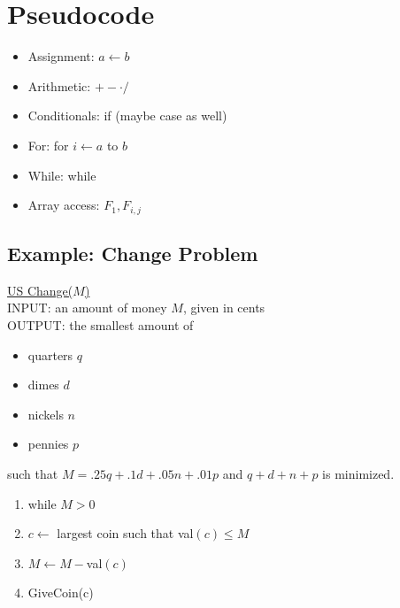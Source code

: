 \documentclass[10pt]{article}
\newenvironment{mitemize}
{
  \begin{itemize}
  \setlength{\itemsep}{1pt}
  \setlength{\parskip}{0pt}
  \setlength{\parsep}{0pt}}{\end{itemize}
}
\newenvironment{menumerate}
{
  \begin{enumerate}
  \setlength{\itemsep}{1pt}
  \setlength{\parskip}{0pt}
  \setlength{\parsep}{0pt}}{\end{enumerate}
}
\begin{document}
\section*{Pseudocode}
\begin{mitemize}
\item Assignment: $a \leftarrow b$
\item Arithmetic: $+ - \cdot /$
\item Conditionals: if (maybe case as well)
\item For: for $i \leftarrow a$ to $b$
\item While: while
\item Array access: $F_1, F_{i,j}$
\end{mitemize}

\subsection*{Example: Change Problem}
\noindent \underline{US Change($M$)} \\
\noindent INPUT: an amount of money $M$, given in cents \\
\noindent OUTPUT: the smallest amount of
\begin{mitemize}
\item quarters $q$
\item dimes $d$
\item nickels $n$
\item pennies $p$
\end{mitemize}
such that $M = .25q + .1d + .05n + .01p$ and $q+d+n+p$ is minimized.
\begin{menumerate}
\item while $M > 0$
\item \hspace{24pt} $c \leftarrow$ largest coin such that val$(c) \leq M$ 
\item \hspace{24pt} $M \leftarrow M - $val$(c)$
\item \hspace{24pt} GiveCoin(c)
\end{menumerate}
\end{document}
